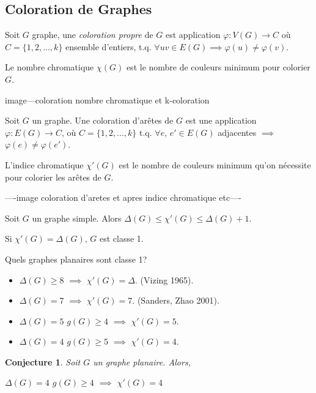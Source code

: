 \documentclass{beamer}
\newtheorem{conjecture}{Conjecture}
\begin{document}
\subsection{Coloration de Graphes}
\begin{frame}
Soit $G$ graphe, une \emph{coloration propre} de $G$ est application $\varphi: V(G) \to C$ où $C=\{1,2,...,k\}$ ensemble d'entiers, t.q. $\forall uv\in E(G) \implies\varphi(u) \neq \varphi(v)$. 

Le nombre chromatique $\chi(G)$ est le nombre de couleurs minimum pour colorier $G$.

image---coloration nombre chromatique et k-coloration

\end{frame}
\begin{frame}
Soit $G$ un graphe. Une coloration d'arêtes de $G$ est une application $\varphi:E(G) \to C$, où $C=\{1,2,...,k\}$ t.q. $\forall e$, $e' \in E(G)$ adjacentes $\implies$ $\varphi(e) \neq \varphi(e')$. 

L'indice chromatique $\chi'(G)$ est le nombre de couleurs minimum qu'on nécessite pour colorier les arêtes de $G$.

----image coloration d'aretes et apres indice chromatique etc----
\end{frame}

\begin{frame}
\begin{theorem}[Vizing]
Soit $G$ un graphe simple. Alors $\Delta(G) \leq \chi'(G) \leq \Delta(G) + 1$.
\end{theorem}
Si $\chi'(G) = \Delta(G)$,  $G$ est classe 1.

\pause
Quels graphes planaires sont classe 1?
\begin{itemize}
\item $\Delta(G) \geq 8$ $\implies$ $\chi'(G)=\Delta$. (Vizing 1965).
\item $\Delta(G) = 7$ $\implies$ $\chi'(G)=7$. (Sanders, Zhao 2001).
\item $\Delta(G) = 5$ $g(G) \geq 4$ $\implies$ $\chi'(G) = 5$.
\item $\Delta(G) = 4$ $g(G) \geq 5$ $\implies$ $\chi'(G) = 4$.
\end{itemize}
\begin{conjecture}
Soit $G$ un graphe planaire. Alors,

$\Delta(G) = 4$ $g(G) \geq 4$ $\implies$ $\chi'(G) = 4$
\end{conjecture}
\end{frame}
\end{document}
